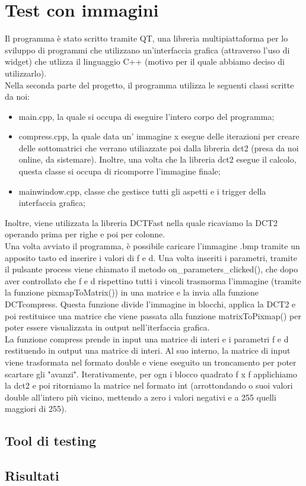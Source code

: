 \documentclass[a4paper,12pt]{report}
\newcommand{\mychapter}[2]{
    \setcounter{chapter}{#1}
    \setcounter{section}{0}
    \chapter*{#2}
    \addcontentsline{toc}{chapter}{#2}
}
\begin{document}
\mychapter{2}{Test con immagini}
Il programma è stato scritto tramite QT, una libreria multipiattaforma per lo sviluppo di programmi che utilizzano un'interfaccia grafica (attraverso l'uso di widget) che utlizza il linguaggio C++ (motivo per il quale abbiamo deciso di utilizzarlo).\\
Nella seconda parte del progetto, il programma utilizza le seguenti classi scritte da noi:
\begin{itemize}
\item main.cpp, la quale si occupa di eseguire l'intero corpo del programma;
\item compress.cpp, la quale data un' immagine x esegue delle iterazioni per creare delle sottomatrici che verrano utiliazzate poi dalla libreria dct2 (presa da noi online, da sistemare). Inoltre, una volta che la libreria dct2 esegue il calcolo, questa classe si occupa di ricomporre l'immagine finale;
\item mainwindow.cpp, classe che gestisce tutti gli aspetti e i trigger della interfaccia grafica;
\end{itemize}
Inoltre, viene utilizzata la libreria DCTFast nella quale ricaviamo la DCT2 operando prima per righe e poi per colonne.\\
Una volta avviato il programma, è possibile caricare l'immagine .bmp tramite un apposito tasto ed inserire i valori di f e d. Una volta inseriti i parametri, tramite il pulsante process viene chiamato il metodo on\_parameters\_clicked(), che dopo aver controllato che f e d rispettino tutti i vincoli trasmorma l'immagine (tramite la funzione pixmapToMatrix()) in una matrice e la invia alla funzione DCTcompress. Questa funzione divide l'immagine in blocchi, applica la DCT2 e poi restituisce una matrice che viene passata alla funzione matrixToPixmap() per poter essere visualizzata in output nell'iterfaccia grafica.\\
La funzione compress prende in input una matrice di interi e i parametri f e d restituendo in output una matrice di interi. Al suo interno, la matrice di input viene trasformata nel formato double e viene eseguito un troncamento per poter scartare gli "avanzi". Iterativamente, per ogn i blocco quadrato f x f applichiamo la dct2 e poi ritorniamo la matrice nel formato int (arrottondando o suoi valori double all'intero più vicino, mettendo a zero i valori negativi e a 255 quelli maggiori di 255). \\
 
\section{Tool di testing}

\section{Risultati}
\end{document}
